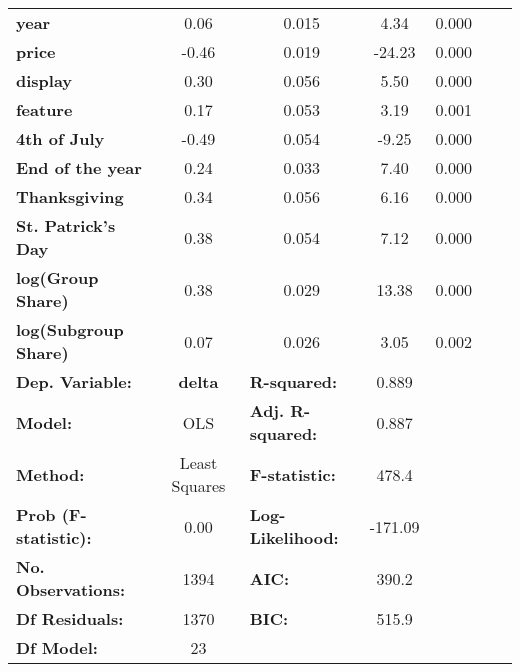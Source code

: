 \begin{tabular}{lcccccc}
\textbf{year}                          &       0.06  &        0.015     &     4.34  &         0.000               \\
\textbf{price}                         &      -0.46  &        0.019     &   -24.23  &         0.000               \\
\textbf{display}                       &       0.30  &        0.056     &     5.50  &         0.000               \\
\textbf{feature}                       &       0.17  &        0.053     &     3.19  &         0.001               \\
\textbf{4th of July}                   &      -0.49  &        0.054     &    -9.25  &         0.000               \\
\textbf{End of the year}               &       0.24  &        0.033     &     7.40  &         0.000               \\
\textbf{Thanksgiving}                  &       0.34  &        0.056     &     6.16  &         0.000               \\
\textbf{St. Patrick's Day}             &       0.38  &        0.054     &     7.12  &         0.000               \\
\textbf{log(Group Share)}              &       0.38  &        0.029     &    13.38  &         0.000               \\
\textbf{log(Subgroup Share)}           &       0.07  &        0.026     &     3.05  &         0.002               \\
\bottomrule

\toprule
\textbf{Dep. Variable:}                    &      \textbf{delta}       & \multicolumn{1}{l}{\textbf{  R-squared:         }} &     0.889   \\
\textbf{Model:}                            &       OLS                                          & \multicolumn{1}{l}{\textbf{  Adj. R-squared:    }} &     0.887   \\
\textbf{Method:}                           &  Least Squares                                     & \multicolumn{1}{l}{\textbf{  F-statistic:       }} &     478.4   \\
\textbf{Prob (F-statistic):}               &        0.00                                        & \multicolumn{1}{l}{\textbf{  Log-Likelihood:    }} &   -171.09   \\
\textbf{No. Observations:}                 &        1394                                        & \multicolumn{1}{l}{\textbf{  AIC:               }} &     390.2   \\
\textbf{Df Residuals:}                     &        1370                                        & \multicolumn{1}{l}{\textbf{  BIC:               }} &     515.9   \\
\textbf{Df Model:}                         &          23                                        & \multicolumn{1}{l}{\textbf{                     }} &             \\
\bottomrule
\end{tabular}
